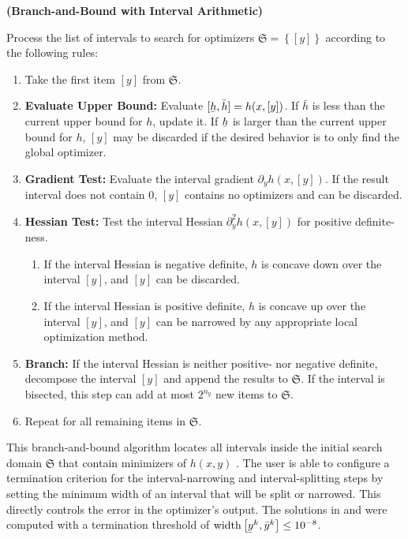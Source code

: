 \documentclass[twoside,leqno, twocolumn]{article}
\newcommand{\frS}{\ensuremath{\mathfrak{S}}}
\newcommand\ubar[1]{\underaccent{\bar}{#1}}
\begin{document}
\begin{algorithm}
	\label{algo:bnb-ia}
	\textbf{(Branch-and-Bound with Interval Arithmetic)}
	
	Process the list of intervals to search for optimizers $\frS = \left\{[y]\right\}$ according to the following rules:
	\begin{enumerate} 
		\item Take the first item $[y]$ from $\frS$.
		\item \textbf{Evaluate Upper Bound:} Evaluate $[\ubar h, \bar h] = h(x, [y])$. If $\bar h$ is less than the current upper bound for $h$, update it. If $\ubar h$ is larger than the current upper bound for $h$, $[y]$ may be discarded if the desired behavior is to only find the global optimizer.
		\item \textbf{Gradient Test:} Evaluate the interval gradient $\partial_y h(x, [y])$. If the result interval does not contain $0$, $[y]$ contains no optimizers and can be discarded.
		\item \textbf{Hessian Test:} Test the interval Hessian $\partial^2_y h(x, [y])$ for positive definite-ness.
		\begin{enumerate}
			\item If the interval Hessian is negative definite, $h$ is concave down over the interval $[y]$, and $[y]$ can be discarded.
			\item If the interval Hessian is positive definite, $h$ is concave up over the interval $[y]$, and $[y]$ can be narrowed by any appropriate local optimization method.
		\end{enumerate}
		\item \textbf{Branch:} If the interval Hessian is neither positive- nor negative definite, decompose the interval $[y]$ and append the results to $\frS$. If the interval is bisected, this step can add at most $2^{n_y}$ new items to $\frS$.
		\item Repeat for all remaining items in $\frS$.
	\end{enumerate}
\end{algorithm}
This branch-and-bound algorithm locates all intervals inside the initial search domain $\frS$ that contain minimizers of $h(x, y)$ \cite{rallGlobalOptimizationUsing1985, deussenGlobalSearchLocal2020}. The user is able to configure a termination criterion for the interval-narrowing and interval-splitting steps by setting the minimum width of an interval that will be split or narrowed. This directly controls the error in the optimizer's output. The solutions in  and  were computed with a termination threshold of $\mathrm{width}\left[\ubar y^k, \bar y^k\right] \leq 10^{-8}$.
\end{document}
